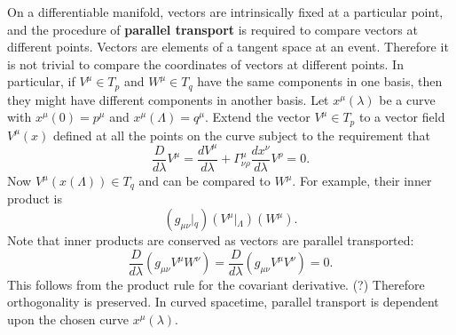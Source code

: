 \documentclass[11pt]{article}
\begin{document}
On a differentiable manifold, vectors are intrinsically fixed at a particular point, and the procedure of \textbf{parallel transport} is required to compare vectors at different points.
Vectors are elements of a tangent space at an event.
Therefore it is not trivial to compare the coordinates of vectors at different points.
In particular, if $V^\mu \in T_p$ and $W^\mu \in T_q$ have the same components in one basis, then they might have different components in another basis.
Let $x^\mu(\lambda)$ be a curve with $x^\mu(0) = p^\mu$ and $x^\mu(\Lambda) = q^\mu$.
Extend the vector $V^\mu \in T_p$ to a vector field $V^\mu(x)$ defined at all the points on the curve subject to the requirement that
$$ \frac{D}{d\lambda} V^\mu = \frac{dV^\mu}{d\lambda} + \Gamma^\mu_{\nu \rho} \frac{dx^\nu}{d\lambda} V^\rho = 0. $$
Now $V^\mu(x(\Lambda)) \in T_q$ and can be compared to $W^\mu$.
For example, their inner product is
$$ (g_{\mu \nu}|{}_q) (V^\mu|{}_\Lambda) (W^\mu). $$
Note that inner products are conserved as vectors are parallel transported:
$$ \frac{D}{d\lambda} (g_{\mu \nu} V^\mu W^\nu) = \frac{D}{d\lambda} (g_{\mu \nu} V^\mu V^\nu) = 0. $$
This follows from the product rule for the covariant derivative. (?)
Therefore orthogonality is preserved.
In curved spacetime, parallel transport is dependent upon the chosen curve $x^\mu(\lambda)$.
\end{document}
